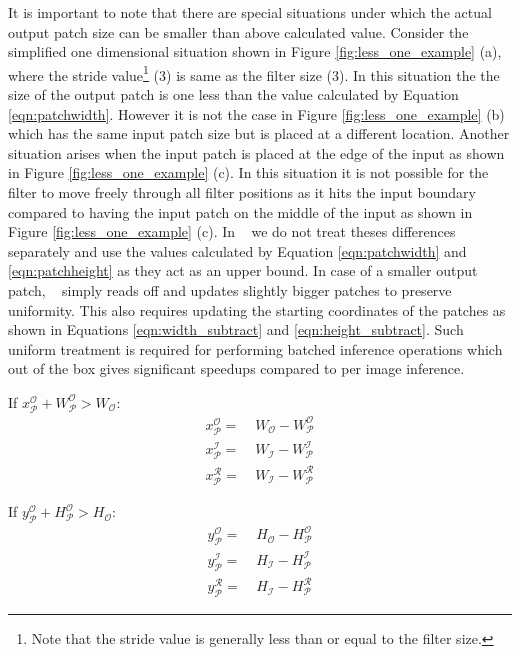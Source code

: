 It is important to note that there are special situations under which the actual output patch size can be smaller than above calculated value. Consider the simplified one dimensional situation shown in Figure \ref{fig:less_one_example} (a), where the stride value\footnote{Note that the stride value is generally less than or equal to the filter size.} (3) is same as the filter size (3). In this situation the the size of the output patch is one less than the value calculated by Equation \ref{eqn:patchwidth}. However it is not the case in Figure \ref{fig:less_one_example} (b) which has the same input patch size but is placed at a different location.
Another situation arises when the input patch is placed at the edge of the input as shown in Figure \ref{fig:less_one_example} (c). In this situation it is not possible for the filter to move freely through all filter positions as it hits the input boundary compared to having the input patch on the middle of the input as shown in Figure \ref{fig:less_one_example} (c).
In \system~ we do not treat theses differences separately and use the values calculated by Equation \ref{eqn:patchwidth} and \ref{eqn:patchheight} as they act as an upper bound. In case of a smaller output patch, \system~ simply reads off and updates slightly bigger patches to preserve uniformity.
This also requires updating the starting coordinates of the patches as shown in Equations \ref{eqn:width_subtract} and \ref{eqn:height_subtract}.
Such uniform treatment is required for performing batched inference operations which out of the box gives significant speedups compared to per image inference.

\vspace{2mm}
\hspace{4mm} If $x^\mathcal{O}_\mathcal{P} + W^\mathcal{O}_\mathcal{P} > W_{\mathcal{O}}:$
\begin{align}
\label{eqn:width_subtract}
x^\mathcal{O}_\mathcal{P} = &~ W_{\mathcal{O}} - W^\mathcal{O}_\mathcal{P}\\
x^\mathcal{I}_\mathcal{P} = &~ W_{\mathcal{I}} - W^\mathcal{I}_\mathcal{P}\\
x^\mathcal{R}_\mathcal{P} = &~ W_{\mathcal{I}} - W^\mathcal{R}_\mathcal{P}
\end{align}

\hspace{4mm} If $y^\mathcal{O}_\mathcal{P} + H^\mathcal{O}_\mathcal{P} > H_{\mathcal{O}}:$
\begin{align}
\label{eqn:height_subtract}
y^\mathcal{O}_\mathcal{P} = &~ H_{\mathcal{O}} - H^\mathcal{O}_\mathcal{P}\\
y^\mathcal{I}_\mathcal{P} = &~ H_{\mathcal{I}} - H^\mathcal{I}_\mathcal{P}\\
y^\mathcal{R}_\mathcal{P} = &~ H_{\mathcal{I}} - H^\mathcal{R}_\mathcal{P}
\end{align}


